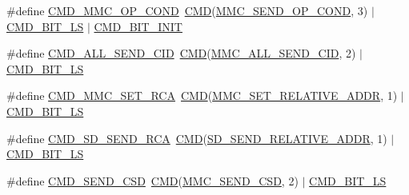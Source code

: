 \begin{DoxyCompactItemize}
\item 
\#define \hyperlink{group___s_d_m_m_c__18_x_x__43_x_x_gaa27ee9c5cdacf1ccf1503e3c5cda20bb}{C\+M\+D\+\_\+\+M\+M\+C\+\_\+\+O\+P\+\_\+\+C\+O\+ND}~\hyperlink{group___s_d_m_m_c__18_x_x__43_x_x_ga7caafa608408eea45aca375d0d5eb211}{C\+MD}(\hyperlink{group___c_h_i_p___s_d_m_m_c___definitions_ga84fa553012e25291f05e4c4be438d78a}{M\+M\+C\+\_\+\+S\+E\+N\+D\+\_\+\+O\+P\+\_\+\+C\+O\+ND}, 3)    $\vert$ \hyperlink{group___s_d_m_m_c__18_x_x__43_x_x_gac7c44bedf5c41fd5ed18712aa2ef69a7}{C\+M\+D\+\_\+\+B\+I\+T\+\_\+\+LS} $\vert$ \hyperlink{group___s_d_m_m_c__18_x_x__43_x_x_gaddd67f85312e1b1fb2d2a83a540a4427}{C\+M\+D\+\_\+\+B\+I\+T\+\_\+\+I\+N\+IT}
\item 
\#define \hyperlink{group___s_d_m_m_c__18_x_x__43_x_x_gae64ed3f71773eb6f8d0f55bca1cc9756}{C\+M\+D\+\_\+\+A\+L\+L\+\_\+\+S\+E\+N\+D\+\_\+\+C\+ID}~\hyperlink{group___s_d_m_m_c__18_x_x__43_x_x_ga7caafa608408eea45aca375d0d5eb211}{C\+MD}(\hyperlink{group___c_h_i_p___s_d_m_m_c___definitions_ga021a2d00b807010b5d280eda200827e8}{M\+M\+C\+\_\+\+A\+L\+L\+\_\+\+S\+E\+N\+D\+\_\+\+C\+ID}, 2)    $\vert$ \hyperlink{group___s_d_m_m_c__18_x_x__43_x_x_gac7c44bedf5c41fd5ed18712aa2ef69a7}{C\+M\+D\+\_\+\+B\+I\+T\+\_\+\+LS}
\item 
\#define \hyperlink{group___s_d_m_m_c__18_x_x__43_x_x_ga51285e363d018d69dca9d8df52b510b1}{C\+M\+D\+\_\+\+M\+M\+C\+\_\+\+S\+E\+T\+\_\+\+R\+CA}~\hyperlink{group___s_d_m_m_c__18_x_x__43_x_x_ga7caafa608408eea45aca375d0d5eb211}{C\+MD}(\hyperlink{group___c_h_i_p___s_d_m_m_c___definitions_ga9952b2deb72ad74ef3a1a84ed44d5a34}{M\+M\+C\+\_\+\+S\+E\+T\+\_\+\+R\+E\+L\+A\+T\+I\+V\+E\+\_\+\+A\+D\+DR}, 1) $\vert$ \hyperlink{group___s_d_m_m_c__18_x_x__43_x_x_gac7c44bedf5c41fd5ed18712aa2ef69a7}{C\+M\+D\+\_\+\+B\+I\+T\+\_\+\+LS}
\item 
\#define \hyperlink{group___s_d_m_m_c__18_x_x__43_x_x_gafe9085a1a7aa518d6e314bc6b0dc4d49}{C\+M\+D\+\_\+\+S\+D\+\_\+\+S\+E\+N\+D\+\_\+\+R\+CA}~\hyperlink{group___s_d_m_m_c__18_x_x__43_x_x_ga7caafa608408eea45aca375d0d5eb211}{C\+MD}(\hyperlink{group___c_h_i_p___s_d_m_m_c___definitions_gaa736c1b1cdeaadb038ed76511c1d0e8b}{S\+D\+\_\+\+S\+E\+N\+D\+\_\+\+R\+E\+L\+A\+T\+I\+V\+E\+\_\+\+A\+D\+DR}, 1) $\vert$ \hyperlink{group___s_d_m_m_c__18_x_x__43_x_x_gac7c44bedf5c41fd5ed18712aa2ef69a7}{C\+M\+D\+\_\+\+B\+I\+T\+\_\+\+LS}
\item 
\#define \hyperlink{group___s_d_m_m_c__18_x_x__43_x_x_ga039c816f90fba6c89d09980c5c1cb888}{C\+M\+D\+\_\+\+S\+E\+N\+D\+\_\+\+C\+SD}~\hyperlink{group___s_d_m_m_c__18_x_x__43_x_x_ga7caafa608408eea45aca375d0d5eb211}{C\+MD}(\hyperlink{group___c_h_i_p___s_d_m_m_c___definitions_ga76d5895ad414df4f3f9c0b63825c6dd6}{M\+M\+C\+\_\+\+S\+E\+N\+D\+\_\+\+C\+SD}, 2) $\vert$ \hyperlink{group___s_d_m_m_c__18_x_x__43_x_x_gac7c44bedf5c41fd5ed18712aa2ef69a7}{C\+M\+D\+\_\+\+B\+I\+T\+\_\+\+LS}

\end{DoxyCompactItemize}
